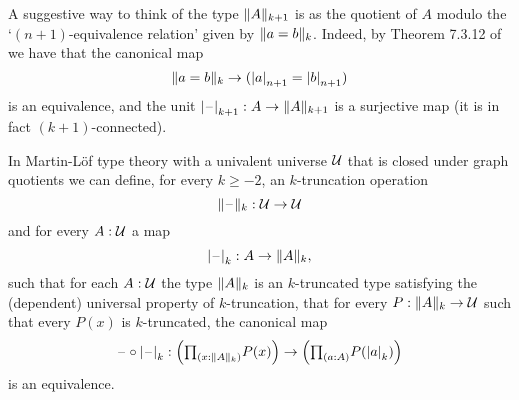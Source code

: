 A suggestive way to think of the type $\trunc{k+1}{A}$ is as the quotient of $A$ modulo the
`$(n+1)$-equivalence relation' given by $\trunc{k}{a=b}$. 
Indeed, by Theorem 7.3.12 of \cite{hottbook} we have that the canonical map
\begin{equation*}
\trunc{k}{a=b}\to(\tproj{n+1}{a}=\tproj{n+1}{b})
\end{equation*}
is an equivalence, and the unit $\tproj{k+1}{\blank}:A\to \trunc{k+1}{A}$ is
a surjective map (it is in fact $(k+1)$-connected). 

\begin{thm}\label{thm:truncation}
In Martin-L\"of type theory with a univalent universe $\UU$ that is closed under
graph quotients we can define, for every $k\geq -2$, an $k$-truncation operation
\begin{equation*}
\trunc{k}{\blank} : \UU\to\UU
\end{equation*}
and for every $A:\UU$ a map
\begin{equation*}
\tproj{k}{\blank}:A\to\trunc{k}{A},
\end{equation*}
such that for each $A:\UU$ the type $\trunc{k}{A}$ is an $k$-truncated type satisfying the (dependent) universal property of $k$-truncation, that for every $P:\trunc{k}{A}\to\UU$ such that every $P(x)$ is $k$-truncated,
the canonical map
\begin{equation*}
\blank\circ\tproj{k}{\blank} : \Big(\prd{x:\trunc{k}{A}}P(x)\Big)\to\Big(\prd{a:A}P(\tproj{k}{a})\Big)
\end{equation*}
is an equivalence.
\end{thm}

